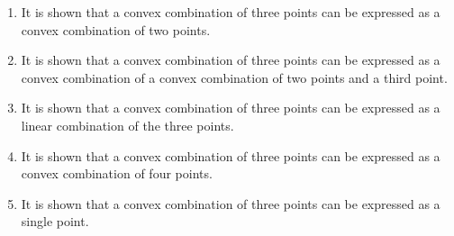 \documentclass{article}%
\begin{document}
\begin{enumerate}[label=\Alph*.]%
\item It is shown that a convex combination of three points can be expressed as a convex combination of two points.%
\item It is shown that a convex combination of three points can be expressed as a convex combination of a convex combination of two points and a third point.%
\item It is shown that a convex combination of three points can be expressed as a linear combination of the three points.%
\item It is shown that a convex combination of three points can be expressed as a convex combination of four points.%
\item It is shown that a convex combination of three points can be expressed as a single point.%
\end{enumerate}%
\vspace{1em}

%
\newpage%
\end{document}
